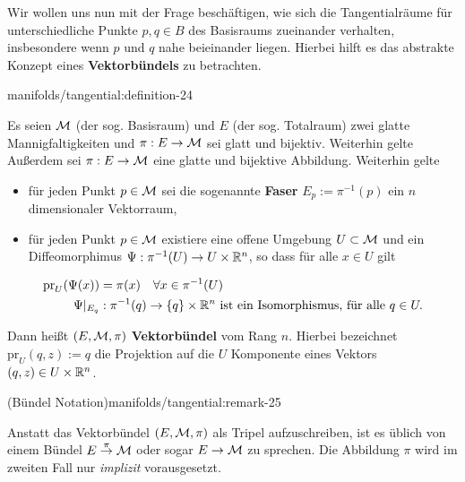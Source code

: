 \par
Wir wollen uns nun mit der Frage beschäftigen, wie sich die Tangentialräume für unterschiedliche Punkte \(p,q\in B\) des Basisraums zueinander verhalten, insbesondere wenn \(p\) und \(q\) nahe beieinander liegen.
Hierbei hilft es das abstrakte Konzept eines \textbf{Vektorbündels} zu betrachten.
\begin{definition}{}{manifolds/tangential:definition-24}



\par
Es seien \(\mathcal{M}\) (der sog. Basisraum) und \(E\) (der sog. Totalraum) zwei glatte Mannigfaltigkeiten und \(\pi:E\to \mathcal{M}\) sei glatt und bijektiv. Weiterhin gelte
Außerdem sei \(\pi:E\to \mathcal{M}\) eine glatte und bijektive Abbildung.
Weiterhin gelte
\begin{itemize}
\item {} 
\par
für jeden Punkt \(p\in \mathcal{M}\) sei die sogenannte \textbf{Faser} \(E_p:= \pi^{-1}(p)\) ein \(n\) dimensionaler Vektorraum,

\item {} 
\par
für jeden Punkt \(p\in \mathcal{M}\) existiere eine offene Umgebung \(U\subset \mathcal{M}\) und ein Diffeomorphimus \(\Psi: \pi^{-1}(U)\to U\times\mathbb{R}^n\), so dass für alle \(x\in U\) gilt

\end{itemize}
\begin{align*}
\text{pr}_U(\Psi(x)) &= \pi(x)\quad\forall x\in \pi^{-1}(U)\\
\Psi\rvert_{E_q}&: \pi^{-1}(q) \to \{q\}\times \mathbb{R}^n \text{ ist ein Isomorphismus, für alle }q\in U.
\end{align*}
\par
Dann heißt \((E,\mathcal{M},\pi)\) \textbf{Vektorbündel} vom Rang \(n\).
Hierbei bezeichnet \(\text{pr}_U(q, z):= q\) die Projektion auf die \(U\) Komponente eines Vektors \((q,z)\in U\times\mathbb{R}^n\).
\end{definition}
\begin{remark}{(Bündel Notation)}{manifolds/tangential:remark-25}



\par
Anstatt das Vektorbündel \((E,\mathcal{M},\pi)\) als Tripel aufzuschreiben, ist es üblich von einem Bündel \(E\overset{\pi}{\to}\mathcal{M}\) oder sogar \(E\to\mathcal{M}\) zu sprechen.
Die Abbildung \(\pi\) wird im zweiten Fall nur \emph{implizit} vorausgesetzt.
\end{remark}

